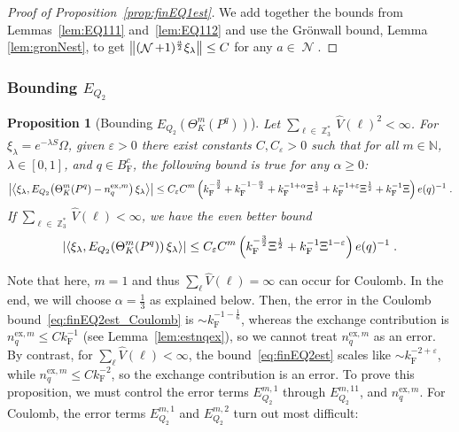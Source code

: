 \documentclass[12pt,a4paper]{article}
\numberwithin{equation}{section}
\newcommand{\NNN}{\mathbb{N}}
\newcommand{\1}{\mathbb{I}}
\newcommand{\ex}{\mathrm{ex}}
\newcommand{\F}{\mathrm{F}}
\DeclareMathOperator{\Z}{\mathbb{Z}}
\DeclareMathOperator{\NN}{\mathcal{N}}
\newcommand{\half}{\frac{1}{2}}
\newcommand{\eva}[1]{\left\langle #1 \right\rangle}
\theoremstyle{plain}
\newtheorem{proposition}[theorem]{Proposition}
\theoremstyle{definition}
\theoremstyle{remark}
\theoremstyle{plain}
\theoremstyle{definition}
\theoremstyle{remark}
\begin{document}
\begin{proof}[Proof of Proposition~\ref{prop:finEQ1est}]
We add together the bounds from Lemmas~\ref{lem:EQ111} and~\ref{lem:EQ112} and use the Gr\"onwall bound, Lemma \ref{lem:gronNest}, to get $ \norm{(\NN+1)^{\frac{a}{2}} \xi_\lambda} \le C $ for any $ a \in \NN $.
\end{proof}






\subsubsection{Bounding $E_{Q_2}$}

\begin{proposition}[Bounding $E_{Q_2}(\Theta^m_{K}(P^q))$]\label{prop:finEQ2est}
Let $ \sum_{\ell \in \Z_3^*} \hat{V}(\ell)^2 < \infty $. For $\xi_\lambda = e^{-\lambda S} \Omega$, given $ \varepsilon > 0 $ there exist constants $ C, C_\varepsilon > 0 $ such that for all $ m \in \NNN $, $ \lambda \in [0,1] $, and $ q \in B_{\F}^c $, the following bound is true for any $ \alpha \ge 0 $:
\begin{equation}\label{eq:finEQ2est_Coulomb}
	\abs{\eva{\xi_\lambda, E_{Q_2}\!\left(\Theta^m_K(P^q)- n_q^{\ex,m} \right) \xi_\lambda}} 
	\leq C_\varepsilon C^m \left( k_{\F}^{-\frac 32} 
		+ k_{\F}^{-1 - \frac{\alpha}{2}} 
		+ k_{\F}^{-1+\alpha} \Xi^\half
		+ k_{\F}^{-1+\varepsilon} \Xi^\half
		+ k_{\F}^{-1} \Xi \right) e(q)^{-1} \;. \\
\end{equation}
If $ \sum_{\ell \in \Z_3^*} \hat{V}(\ell) < \infty $, we have the even better bound
\begin{equation}\label{eq:finEQ2est}
	\abs{\eva{\xi_\lambda, E_{Q_2}\!\left(\Theta^m_K(P^q)\right) \xi_\lambda}} 
	\leq C_\varepsilon C^m \left( k_{\F}^{-\frac{3}{2}} \Xi^\half
		+ k_{\F}^{-1} \Xi^{1-\varepsilon} \right) e(q)^{-1} \;. \\
\end{equation}
\end{proposition}

\textcolor{green!30!black}{Note that here, $ m = 1 $ and thus $ \sum_\ell \hat{V}(\ell) = \infty $ can occur for Coulomb. In the end, we will choose $ \alpha = \frac 13 $ as explained below. Then, the error in the Coulomb bound~\eqref{eq:finEQ2est_Coulomb} is $ \sim k_{\F}^{-1-\frac 16} $, whereas the exchange contribution is $ n_q^{\ex,m} \le C k_{\F}^{-1} $ (see Lemma~\ref{lem:estnqex}), so we cannot treat $ n_q^{\ex,m} $ as an error. By contrast, for $ \sum_\ell \hat{V}(\ell) < \infty $, the bound~\eqref{eq:finEQ2est} scales like $ \sim k_{\F}^{-2+\varepsilon} $, while $ n_q^{\ex,m} \le C k_{\F}^{-2} $, so the exchange contribution is an error.} To prove this proposition, we must control the error terms $ E^{m,1}_{Q_2} $ through $ E^{m,11}_{Q_2} $, and $ n_q^{\ex,m} $. \textcolor{green!30!black}{For Coulomb, the error terms $ E^{m,1}_{Q_2} $ and $ E^{m,2}_{Q_2} $ turn out most difficult:}
\end{document}
